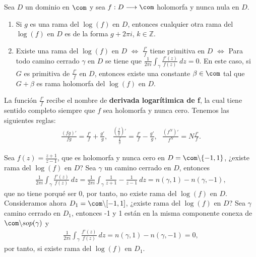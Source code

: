 \begin{teo}[Recopilatorio]
Sea $D$ un dominio en $\com$ y sea $f: D \longrightarrow \com$ holomorfa y nunca nula en $D$.
\begin{enumerate}
    \item Si $g$ es una rama del $\log(f)$ en $D$, entonces cualquier otra rama del $\log(f)$ en $D$ es de la forma $g + 2\pi i$, $k \in \mathbb{Z}$.
    \item Existe una rama del $\log(f)$ en $D$ $\Longleftrightarrow$ $\frac{f'}{f}$ tiene primitiva en $D$ $\Longleftrightarrow$ Para todo camino cerrado $\gamma$ en $D$ se tiene que $\frac{1}{2\pi i}\int_{\gamma} \frac{f'(z)}{f(z)} \ dz = 0$. En este caso, si $G$ es primitiva de $\frac{f'}{f}$ en $D$, entonces existe una constante $\beta \in \com$ tal que $G + \beta$ es rama holomorfa del $\log(f)$ en $D$.
\end{enumerate}
\end{teo}

\begin{obs}
La función $\frac{f'}{f}$ recibe el nombre de \textbf{derivada logarítimica de f}, la cual tiene sentido completo siempre que $f$ sea holomorfa y nunca cero. Tenemos las siguientes reglas:
\begin{align*}
    \frac{(fg)'}{fg} = \frac{f'}{f} + \frac{g'}{g}, \ \ \ \frac{\left(  \frac{f}{g}\right)'}{\frac{f}{g}} = \frac{f'}{f} - \frac{g'}{g}, \ \ \ \frac{(f^N)'}{f^N} = N \frac{f'}{f}.
\end{align*}
\end{obs}

\begin{ejemplo}
Sea $f(z) = \frac{z+1}{z-1}$, que es holomorfa y nunca cero en $D = \com \backslash \{-1,1\}$, ¿existe rama del $\log(f)$ en $D$? Sea $\gamma$ un camino cerrado en $D$, entonces
\begin{align*}
    \frac{1}{2\pi i} \int_{\gamma} \frac{f'(z)}{f(z)} \ dz = \frac{1}{2\pi i} \int_{\gamma} \frac{1}{z+1} - \frac{1}{z-1} \ dz = n(\gamma,1) - n(\gamma,-1),
\end{align*}
que no tiene porqué ser 0, por tanto, no existe rama del $\log(f)$ en $D$.
\\
\newline
Consideramos ahora $D_1 = \com \backslash [-1,1]$, ¿existe rama del $\log(f)$ en $D$? Sea $\gamma$ camino cerrado en $D_1$, entonces -1 y 1 están en la misma componente conexa de $\com \backslash sop(\gamma)$ y 
\begin{align*}
    \frac{1}{2\pi i} \int_{\gamma} \frac{f'(z)}{f(z)} \ dz = n(\gamma,1) - n(\gamma,-1) = 0,
\end{align*}
por tanto, si existe rama del $\log(f)$ en $D_1$.
\end{ejemplo}

